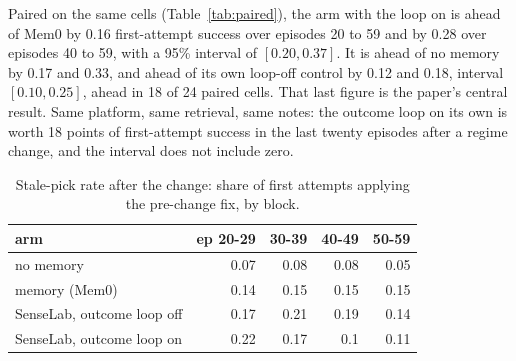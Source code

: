 \documentclass[11pt]{article}
\begin{document}
Paired on the same cells (Table~\ref{tab:paired}), the arm with the loop on is ahead of Mem0
by 0.16 first-attempt success over episodes 20 to 59 and by 0.28 over episodes 40 to 59, with a
95\% interval of $[0.20, 0.37]$. It is ahead of no memory by 0.17 and 0.33, and ahead of its own
loop-off control by 0.12 and 0.18, interval $[0.10, 0.25]$, ahead in 18 of 24 paired cells. That
last figure is the paper's central result. Same platform, same retrieval, same notes: the
outcome loop on its own is worth 18 points of first-attempt success in the last twenty episodes
after a regime change, and the interval does not include zero.

\begin{table}[H]
\centering\scriptsize
{}
\caption{Recovery after the change: first-attempt success on changed classes by 10-episode block; cells recovered = three consecutive first-attempt successes on a changed class.}
\label{tab:recovery}
\end{table}

\begin{table}[H]
\centering\scriptsize
\begin{tabular}{lrrrr}
\toprule
\textbf{arm} & \textbf{ep 20-29} & \textbf{30-39} & \textbf{40-49} & \textbf{50-59} \\
\midrule
no memory & 0.07 & 0.08 & 0.08 & 0.05 \\
memory (Mem0) & 0.14 & 0.15 & 0.15 & 0.15 \\
SenseLab, outcome loop off & 0.17 & 0.21 & 0.19 & 0.14 \\
SenseLab, outcome loop on & 0.22 & 0.17 & 0.1 & 0.11 \\
\bottomrule
\end{tabular}
\caption{Stale-pick rate after the change: share of first attempts applying the pre-change fix, by block.}
\label{tab:stale}
\end{table}
\end{document}
